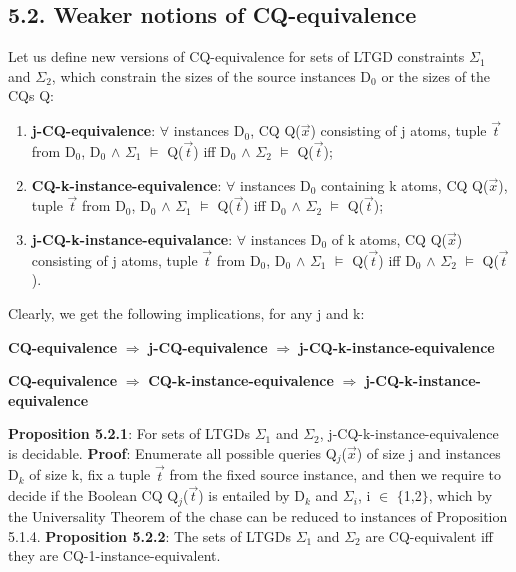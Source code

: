 \documentclass[11pt, a4paper, dvipsnames]{article}
\begin{document}
\subsection{5.2. Weaker notions of CQ-equivalence}
Let us define new versions of CQ-equivalence for sets of LTGD constraints $\Sigma_{1}$ and $\Sigma_{2}$, which constrain the sizes of the source instances D$_{0}$ or the sizes of the CQs Q:
\begin{enumerate}
	\item \textbf{j-CQ-equivalence}: $\forall$ instances D$_{0}$, CQ Q($\vec{x}$) consisting of j atoms, tuple $\vec{t}$ from D$_{0}$, D$_{0}$ $\wedge$ $\Sigma_{1}$ $\vDash$ Q($\vec{t}$) iff D$_{0}$ $\wedge$ $\Sigma_{2}$ $\vDash$ Q($\vec{t}$);
	\item \textbf{CQ-k-instance-equivalence}: $\forall$ instances D$_{0}$ containing k atoms, CQ Q($\vec{x}$), tuple $\vec{t}$ from D$_{0}$, D$_{0}$ $\wedge$ $\Sigma_{1}$ $\vDash$ Q($\vec{t}$) iff D$_{0}$ $\wedge$ $\Sigma_{2}$ $\vDash$ Q($\vec{t}$);
	\item \textbf{j-CQ-k-instance-equivalance}: $\forall$ instances D$_{0}$ of k atoms, CQ Q($\vec{x}$) consisting of j atoms, tuple $\vec{t}$ from D$_{0}$, D$_{0}$ $\wedge$ $\Sigma_{1}$ $\vDash$ Q($\vec{t}$) iff D$_{0}$ $\wedge$ $\Sigma_{2}$ $\vDash$ Q($\vec{t}$).
\end{enumerate}
Clearly, we get the following implications, for any j and k:
\begin{center}
\textbf{CQ-equivalence} $\Rightarrow$ \textbf{j-CQ-equivalence} $\Rightarrow$ \textbf{j-CQ-k-instance-equivalence}
\end{center}
\begin{center}
\textbf{CQ-equivalence} $\Rightarrow$ \textbf{CQ-k-instance-equivalence} $\Rightarrow$ \textbf{j-CQ-k-instance-equivalence}
\end{center}
\textbf{Proposition 5.2.1}: For sets of LTGDs $\Sigma_{1}$ and $\Sigma_{2}$, j-CQ-k-instance-equivalence is decidable.\newline
\textbf{Proof}: Enumerate all possible queries Q$_{j}$($\vec{x}$) of size j and instances D$_{k}$ of size k, fix a tuple $\vec{t}$ from the fixed source instance, and then we require to decide if the Boolean CQ Q$_{j}$($\vec{t}$) is entailed by D$_{k}$ and $\Sigma_{i}$, i $\in$ $\{$1,2$\}$, which by the Universality Theorem of the chase can be reduced to instances of Proposition 5.1.4. \newline
\textbf{Proposition 5.2.2}: The sets of LTGDs $\Sigma_{1}$ and $\Sigma_{2}$ are CQ-equivalent iff they are CQ-1-instance-equivalent.\newline
\end{document}
